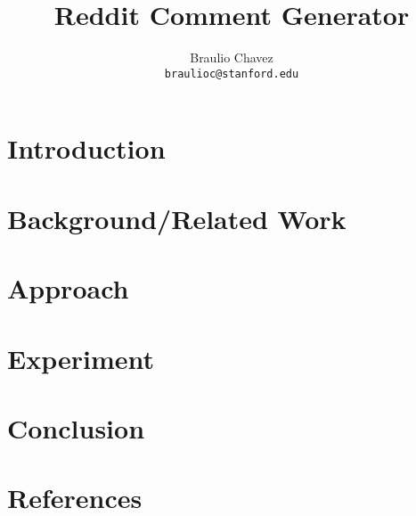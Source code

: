 \documentclass{article} %
\begin{document}
\title{Reddit Comment Generator}
\author{Braulio Chavez \\
  \texttt{braulioc@stanford.edu}}
\maketitle

\begin{abstract}
\end{abstract}
\section{Introduction}
\section{Background/Related Work}
\section{Approach}
\section{Experiment}
\section{Conclusion}
\section{References}
\end{document}
